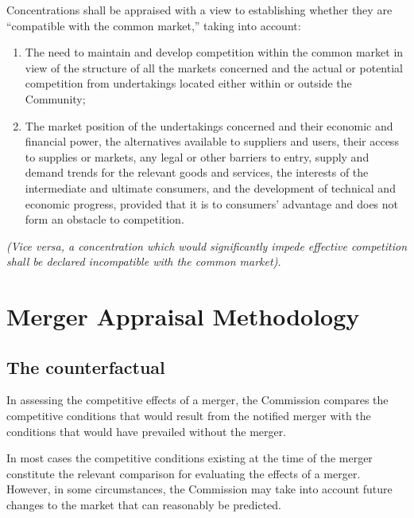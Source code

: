     Concentrations shall be appraised with a view to establishing whether they are “compatible with the common market,” taking into account:

    \begin{enumerate}[label=(\alph*)]
        \item The need to maintain and develop competition within the common market in view of the structure of all the markets concerned and the actual or potential competition from undertakings located either within or outside the Community;
        \item The market position of the undertakings concerned and their economic and financial power, the alternatives available to suppliers and users, their access to supplies or markets, any legal or other barriers to entry, supply and demand trends for the relevant goods and services, the interests of the intermediate and ultimate consumers, and the development of technical and economic progress, provided that it is to consumers' advantage and does not form an obstacle to competition.
    \end{enumerate}
    
    
    \textit{(Vice versa, a concentration which would significantly impede effective competition shall be declared incompatible with the common market).}

\section{Merger Appraisal Methodology}

    \subsection{The counterfactual}

        In assessing the competitive effects of a merger, the Commission compares the competitive conditions that would result from the notified merger with the conditions that would have prevailed without the merger. 
        
        In most cases the competitive conditions existing at the time of the merger constitute the relevant comparison for evaluating the effects of a merger. However, in some circumstances, the Commission may take into account future changes to the market that can reasonably be predicted. 
        
